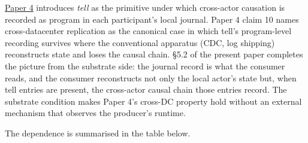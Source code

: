 \documentclass[
]{article}
\begin{document}
\href{04-cross-actor-continuity.md}{Paper 4} introduces \emph{tell} as
the primitive under which cross-actor causation is recorded as program
in each participant's local journal. Paper 4 claim 10 names
cross-datacenter replication as the canonical case in which tell's
program-level recording survives where the conventional apparatus (CDC,
log shipping) reconstructs state and loses the causal chain. §5.2 of the
present paper completes the picture from the substrate side: the journal
record is what the consumer reads, and the consumer reconstructs not
only the local actor's state but, when tell entries are present, the
cross-actor causal chain those entries record. The substrate condition
makes Paper 4's cross-DC property hold without an external mechanism
that observes the producer's runtime.

The dependence is summarised in the table below.
\end{document}
